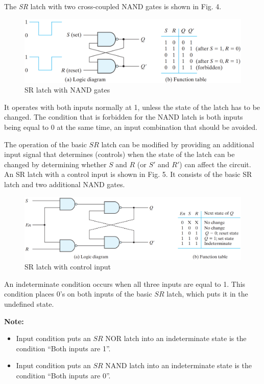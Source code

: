 \vspace*{\fill}
\columnbreak

The \textit{SR} latch with two cross-coupled NAND gates is shown in Fig. 4. 
\begin{figure}[H]
  \centering
  \includegraphics[width=\linewidth]{img/fig-5.4.png}
  \caption{SR latch with NAND gates}
  \label{fig:5.4}
\end{figure}
It operates with both inputs normally at 1, unless the state of the latch has to be changed. The condition that is forbidden for the NAND latch is both inputs being equal to 0 at the same time, an input combination that should be avoided.

The operation of the basic $SR$ latch can be modified by providing an additional input signal that determines (controls) when the state of the latch can be changed by determining whether $S$ and $R$ (or $S'$ and $R'$) can affect the circuit. An SR latch with a control input is shown in Fig. 5. It consists of the basic SR latch and two additional NAND gates.
\begin{figure}[H]
  \centering
  \includegraphics[width=\linewidth]{img/fig-5.5.png}
  \caption{SR latch with control input}
  \label{fig:5.5}
\end{figure}
An indeterminate condition occurs when all three inputs are equal to 1. This condition places 0's on both inputs of the basic $SR$ latch, which puts it in the undefined state.

\textbf{Note:}
\begin{itemize}[leftmargin=0.5cm]
  \item Input condition puts an $SR$ NOR latch into an indeterminate state is the condition ``Both inputs are 1''.
  \item Input condition puts an $SR$ NAND latch into an indeterminate state is the condition ``Both inputs are 0''.
\end{itemize}


